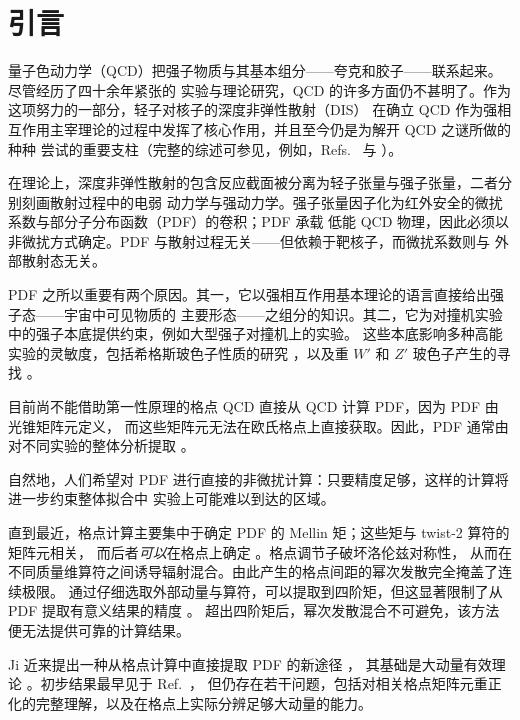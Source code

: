 \section{引言}

量子色动力学（QCD）把强子物质与其基本组分——夸克和胶子——联系起来。尽管经历了四十余年紧张的
实验与理论研究，QCD 的许多方面仍不甚明了。作为这项努力的一部分，轻子对核子的深度非弹性散射（DIS）
在确立 QCD 作为强相互作用主宰理论的过程中发挥了核心作用，并且至今仍是为解开 QCD 之谜所做的种种
尝试的重要支柱（完整的综述可参见，例如，Refs.~\cite{pdg12} 与
\cite{Collins:2011zzd}）。

在理论上，深度非弹性散射的包含反应截面被分离为轻子张量与强子张量，二者分别刻画散射过程中的电弱
动力学与强动力学。强子张量因子化为红外安全的微扰系数与部分子分布函数（PDF）的卷积；PDF 承载
低能 QCD 物理，因此必须以非微扰方式确定。PDF 与散射过程无关——但依赖于靶核子，而微扰系数则与
外部散射态无关。

PDF 之所以重要有两个原因。其一，它以强相互作用基本理论的语言直接给出强子态——宇宙中可见物质的
主要形态——之组分的知识。其二，它为对撞机实验中的强子本底提供约束，例如大型强子对撞机上的实验。
这些本底影响多种高能实验的灵敏度，包括希格斯玻色子性质的研究
\cite{Thorne:2011kq,Alekhin:2010dd,Alekhin:2011ey}，以及重 $W'$
和 $Z'$ 玻色子产生的寻找 \cite{Brady:2011hb}。

目前尚不能借助第一性原理的格点 QCD 直接从 QCD 计算 PDF，因为 PDF 由光锥矩阵元定义，
而这些矩阵元无法在欧氏格点上直接获取。因此，PDF 通常由对不同实验的整体分析提取
\cite{Jimenez-Delgado:2014xza,Jimenez-Delgado:2013boa,Ball:2013lla,
Arbabifar:2013tma,Owens:2012bv,Accardi:2011fa,Leader:2010rb,Blumlein:2010rn,
Hirai:2008aj}。

自然地，人们希望对 PDF 进行直接的非微扰计算：只要精度足够，这样的计算将进一步约束整体拟合中
实验上可能难以到达的区域。

直到最近，格点计算主要集中于确定 PDF 的 Mellin 矩；这些矩与 twist-2 算符的矩阵元相关，
而后者\emph{可以}在格点上确定
\cite{Bali:2012av,Braun:2008ur,Guagnelli:2004ga}。格点调节子破坏洛伦兹对称性，
从而在不同质量维算符之间诱导辐射混合。由此产生的格点间距的幂次发散完全掩盖了连续极限。
通过仔细选取外部动量与算符，可以提取到四阶矩，但这显著限制了从 PDF 提取有意义结果的精度
\cite{Detmold:2003rq,Detmold:2001dv}。
超出四阶矩后，幂次发散混合不可避免，该方法便无法提供可靠的计算结果。

Ji 近来提出一种从格点计算中直接提取 PDF 的新途径 \cite{Ma:2014jla,Ji:2013dva}，
其基础是大动量有效理论 \cite{Ji:2014gla}。初步结果最早见于 Ref.~\cite{Lin:2014zya}，
但仍存在若干问题，包括对相关格点矩阵元重正化的完整理解，以及在格点上实际分辨足够大动量的能力。

